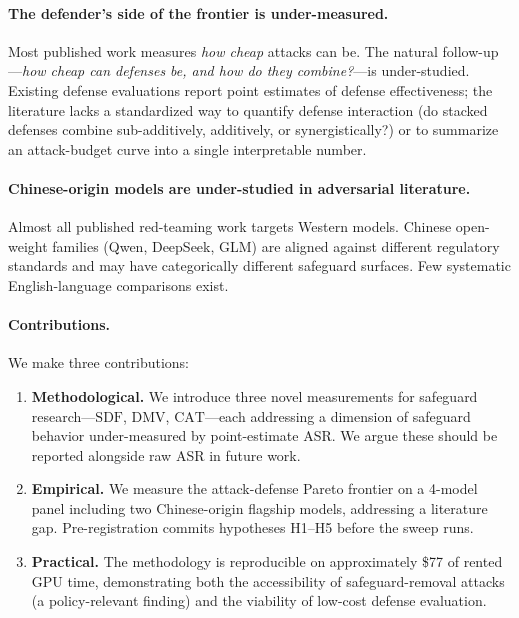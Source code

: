 \documentclass[11pt,letterpaper]{article}
\newcommand{\SDF}{\mathrm{SDF}}
\newcommand{\DMV}{\mathrm{DMV}}
\newcommand{\CAT}{\mathrm{CAT}}
\begin{document}
\paragraph{The defender's side of the frontier is under-measured.} Most
published work measures \emph{how cheap} attacks can be. The natural
follow-up---\emph{how cheap can defenses be, and how do they combine?}---is
under-studied. Existing defense evaluations report point estimates of
defense effectiveness; the literature lacks a standardized way to quantify
defense interaction (do stacked defenses combine sub-additively,
additively, or synergistically?) or to summarize an attack-budget curve
into a single interpretable number.

\paragraph{Chinese-origin models are under-studied in adversarial
literature.} Almost all published red-teaming work targets Western models.
Chinese open-weight families (Qwen, DeepSeek, GLM) are aligned against
different regulatory standards and may have categorically different
safeguard surfaces. Few systematic English-language comparisons exist.

\paragraph{Contributions.} We make three contributions:

\begin{enumerate}
  \item \textbf{Methodological.} We introduce three novel measurements for
        safeguard research---$\SDF$, $\DMV$, $\CAT$---each addressing a
        dimension of safeguard behavior under-measured by point-estimate
        ASR. We argue these should be reported alongside raw ASR in future
        work.
  \item \textbf{Empirical.} We measure the attack-defense Pareto frontier
        on a 4-model panel including two Chinese-origin flagship models,
        addressing a literature gap. Pre-registration commits hypotheses
        H1--H5 before the sweep runs.
  \item \textbf{Practical.} The methodology is reproducible on
        approximately \$77 of rented GPU time, demonstrating both the
        accessibility of safeguard-removal attacks (a policy-relevant
        finding) and the viability of low-cost defense evaluation.
\end{enumerate}
\end{document}
